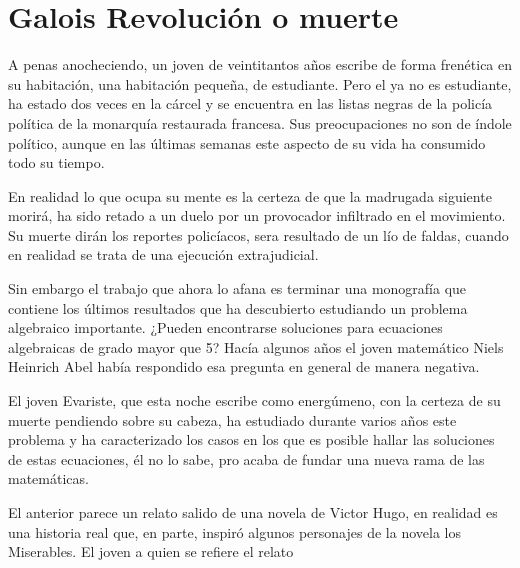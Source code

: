 \chapter{Galois Revolución o muerte}

A penas anocheciendo, un joven de veintitantos años escribe de forma frenética en su habitación, una habitación pequeña, de estudiante.  Pero el ya no es estudiante, ha estado dos veces en la cárcel y se encuentra en las listas negras de la policía política de la monarquía restaurada francesa. Sus preocupaciones no son de índole político, aunque en las últimas semanas este aspecto de su vida ha consumido todo su tiempo. 

En realidad lo que ocupa su mente es la  certeza de que la madrugada siguiente morirá, ha sido  retado a un duelo por un provocador infiltrado en el movimiento. Su muerte dirán los reportes policíacos, sera resultado de un lío de faldas, cuando en realidad se trata de una ejecución extrajudicial.

Sin embargo el trabajo que ahora lo afana es terminar una monografía que contiene los últimos resultados que ha descubierto estudiando un problema algebraico importante. ¿Pueden encontrarse soluciones para ecuaciones algebraicas de grado mayor que 5? Hacía algunos años el joven matemático Niels Heinrich Abel había respondido esa pregunta en general de manera negativa. 

 El joven Evariste, que esta noche escribe como energúmeno, con la certeza de su muerte pendiendo sobre su cabeza, ha estudiado durante varios años este problema y ha caracterizado los casos en los que es posible hallar las soluciones de estas ecuaciones, él no lo sabe, pro acaba de fundar una nueva rama de las matemáticas. 

El anterior parece un relato salido de una novela de Victor Hugo, en realidad es una historia real que, en parte, inspiró algunos personajes de la novela  los Miserables. El joven a quien se refiere el relato
